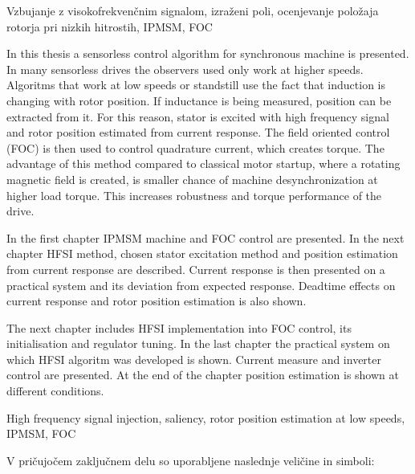 \documentclass[a4paper,twoside,openright,12pt,slovene]{book}
\begin{document}
\kljucnebesede
Vzbujanje z visokofrekvenčnim signalom, izraženi poli, ocenjevanje položaja rotorja pri nizkih hitrostih, IPMSM, FOC



\abstract

In this thesis a sensorless control algorithm for synchronous machine is presented. In many sensorless drives the observers used only work at higher speeds. Algoritms that work at low speeds or
standstill use the fact that induction is changing with rotor position. If inductance is being measured, position can be extracted from it. For this reason, stator is excited with high frequency
signal and rotor position estimated from current response. The field oriented control (FOC) is then used to control quadrature current, which creates torque. The advantage of this method compared to
classical motor startup, where a rotating magnetic field is created, is smaller chance of machine desynchronization at higher load torque. This increases robustness and torque performance of the
drive.

In the first chapter IPMSM machine and FOC control are presented. In the next chapter HFSI method, chosen stator excitation method and position estimation from current response are described. Current
response is then presented on a practical system and its deviation from expected response. Deadtime effects on current response and rotor position estimation is also shown.

The next chapter includes HFSI implementation into FOC control, its initialisation and regulator tuning. In the last chapter the practical system on which HFSI algoritm was developed is shown. Current
measure and inverter control are presented. At the end of the chapter position estimation is shown at different conditions.

\keywords
High frequency signal injection, saliency, rotor position estimation at low speeds, IPMSM, FOC


\tableofcontents

\seznamslik

\seznamsimbolov
V pričujočem zaključnem delu so uporabljene naslednje veličine in simboli:
\end{document}
